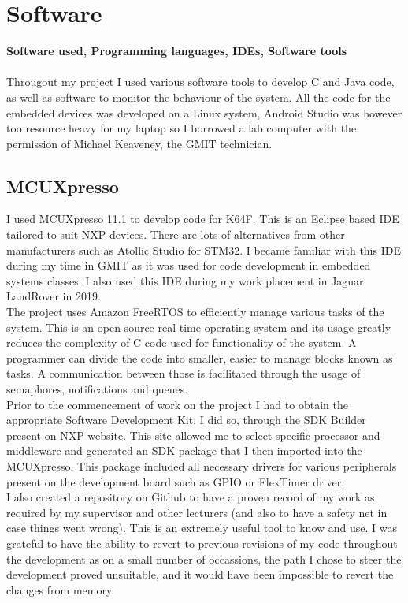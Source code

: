\documentclass[12pt,a4paper]{article}
\begin{document}
	\section{Software}
	{\bfseries Software used, Programming languages, IDEs, Software tools}\\\\
	Througout my project I used various software tools to develop C and Java code, as well as
	software to monitor the behaviour of the system. All the code for the embedded devices was developed on a Linux system, Android Studio was however too resource heavy for my laptop so I borrowed a lab computer with the permission of Michael Keaveney, the GMIT technician.
	
		\subsection{MCUXpresso}
		I used MCUXpresso 11.1 to develop code for K64F. This is an Eclipse based IDE tailored to suit NXP devices. There are lots of alternatives from other manufacturers such as Atollic Studio for STM32. I became familiar with this IDE during my time in GMIT as it 
		was used for code development in embedded systems classes. I also used this IDE during my work placement in Jaguar LandRover in 2019.\\
		
		The project uses Amazon FreeRTOS to efficiently manage various tasks of the system. This is an open-source real-time operating system and its usage greatly reduces the complexity of C code used for functionality of the system. A programmer can divide the code into smaller, easier to manage blocks known as tasks. A communication between those is facilitated through the usage of semaphores, notifications and queues.\\
		
		Prior to the commencement of work on the project I had to obtain the appropriate Software
		Development Kit. I did so, through the SDK Builder present on NXP website. This site allowed 
		me to select specific processor and middleware and generated an SDK package that I then 
		imported into the MCUXpresso. This package included all necessary drivers for various 
		peripherals present on the development board such as GPIO or FlexTimer driver.\\
		
		I also created a repository on Github to have a proven record of my work as required 
		by my supervisor and other lecturers (and also to have a safety net in case things went 
		wrong). This is an extremely useful tool to know and use. I was grateful to have the ability to 
		revert to previous revisions of my code throughout the development as on a small number of occassions, the  
		path I chose to steer the development proved unsuitable, and it would have been  
		impossible to revert the changes from memory.
		\newpage
	
\end{document}

